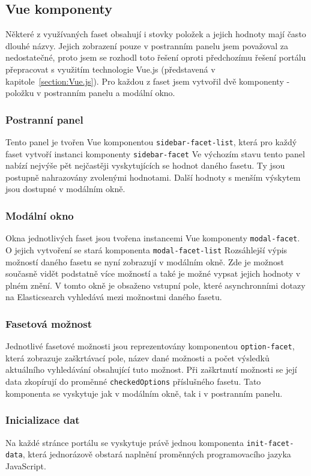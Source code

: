 \subsection{Vue komponenty}
Některé z využívaných faset obsahují i stovky položek a jejich hodnoty mají často dlouhé názvy. Jejich zobrazení pouze v postranním panelu jsem považoval za nedostatečné, proto jsem se rozhodl toto řešení oproti předchozímu řešení portálu přepracovat s využitím technologie Vue.js (představená v kapitole~\ref{section:Vue.js}). Pro každou z faset jsem vytvořil dvě komponenty - položku v postranním panelu a modální okno.

\subsubsection{Postranní panel}
Tento panel je tvořen Vue komponentou \texttt{sidebar-facet-list}, která pro každý faset vytvoří instanci komponenty \texttt{sidebar-facet}
Ve výchozím stavu tento panel nabízí nejvýše pět nejčastěji vyskytujících se hodnot daného fasetu. Ty jsou postupně nahrazovány zvolenými hodnotami. Další hodnoty s menším výskytem jsou dostupné v modálním okně.

\subsubsection*{Modální okno}
Okna jednotlivých faset jsou tvořena instancemi Vue komponenty \texttt{modal-facet}. O jejich vytvoření se stará komponenta \texttt{modal-facet-list}
Rozsáhlejší výpis možností daného fasetu se nyní zobrazují v modálním okně. Zde je možnost současně vidět podstatně více možností a také je možné vypsat jejich hodnoty v plném znění. V tomto okně je obsaženo vstupní pole, které asynchronními dotazy na Elasticsearch vyhledává mezi možnostmi daného fasetu.

\subsubsection*{Fasetová možnost}
Jednotlivé fasetové možnosti jsou reprezentovány komponentou \texttt{option-facet}, která zobrazuje zaškrtávací pole, název dané možnosti a počet výsledků aktuálního vyhledávání obsahující tuto možnost. Při zaškrtnutí možnosti se její data zkopírují do proměnné \texttt{checkedOptions} příslušného fasetu. Tato komponenta se vyskytuje jak v modálním okně, tak i v postranním panelu.


\subsubsection*{Inicializace dat}
Na každé stránce portálu se vyskytuje právě jednou komponenta \texttt{init-facet-data}, která jednorázově obstará naplnění proměnných programovacího jazyka JavaScript.

